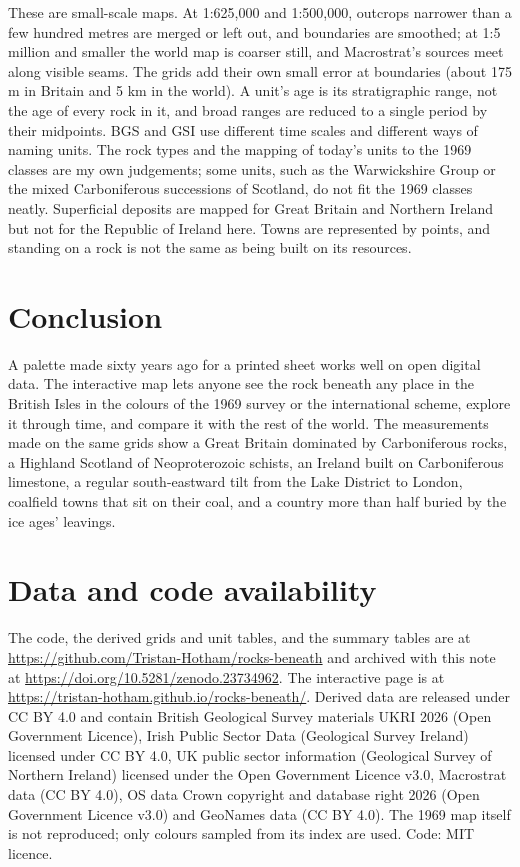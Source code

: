 \documentclass[11pt,a4paper]{article}
\begin{document}
These are small-scale maps. At 1:625,000 and 1:500,000, outcrops narrower than a few hundred metres are merged or left out, and boundaries are smoothed; at 1:5 million and smaller the world map is coarser still, and Macrostrat's sources meet along visible seams. The grids add their own small error at boundaries (about 175 m in Britain and 5 km in the world). A unit's age is its stratigraphic range, not the age of every rock in it, and broad ranges are reduced to a single period by their midpoints. BGS and GSI use different time scales and different ways of naming units. The rock types and the mapping of today's units to the 1969 classes are my own judgements; some units, such as the Warwickshire Group or the mixed Carboniferous successions of Scotland, do not fit the 1969 classes neatly. Superficial deposits are mapped for Great Britain and Northern Ireland but not for the Republic of Ireland here. Towns are represented by points, and standing on a rock is not the same as being built on its resources.

\section{Conclusion}

A palette made sixty years ago for a printed sheet works well on open digital data. The interactive map lets anyone see the rock beneath any place in the British Isles in the colours of the 1969 survey or the international scheme, explore it through time, and compare it with the rest of the world. The measurements made on the same grids show a Great Britain dominated by Carboniferous rocks, a Highland Scotland of Neoproterozoic schists, an Ireland built on Carboniferous limestone, a regular south-eastward tilt from the Lake District to London, coalfield towns that sit on their coal, and a country more than half buried by the ice ages' leavings.

\section*{Data and code availability}

The code, the derived grids and unit tables, and the summary tables are at \url{https://github.com/Tristan-Hotham/rocks-beneath} and archived with this note at \url{https://doi.org/10.5281/zenodo.23734962}. The interactive page is at \url{https://tristan-hotham.github.io/rocks-beneath/}. Derived data are released under CC BY 4.0 and contain British Geological Survey materials \textcopyright{} UKRI 2026 (Open Government Licence), Irish Public Sector Data (Geological Survey Ireland) licensed under CC BY 4.0, UK public sector information (Geological Survey of Northern Ireland) licensed under the Open Government Licence v3.0, Macrostrat data (CC BY 4.0), OS data \textcopyright{} Crown copyright and database right 2026 (Open Government Licence v3.0) and GeoNames data (CC BY 4.0). The 1969 map itself is not reproduced; only colours sampled from its index are used. Code: MIT licence.
\end{document}
